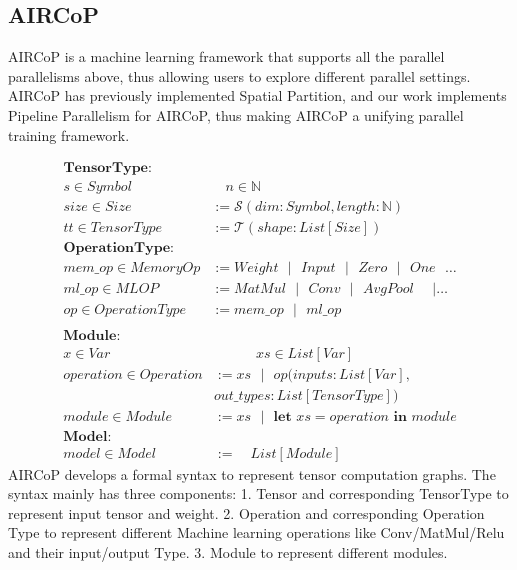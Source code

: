 \documentclass[sigplan, nonacm]{acmart}\settopmatter{printfolios=true,printccs=false,printacmref=false}
\begin{document}
\subsection{AIRCoP}
AIRCoP \cite{aircopfeiwang} is a machine learning framework that supports all the parallel parallelisms above, thus allowing users to explore different parallel settings. AIRCoP has previously implemented Spatial Partition, and our work implements Pipeline Parallelism for AIRCoP, thus making AIRCoP a unifying parallel training framework.\par
\begin{align*}\label{formalsyntax}
  \textbf{TensorType}:& \\
  s \in Symbol& \quad n  \in \mathbb{N} \\
  size \in Size& :=\mathcal{S}(dim:Symbol,length:\mathbb{N})\\
  tt\in TensorType& := \mathcal{T}(shape:List[Size])\\
  \textbf{OperationType}:& \\
  mem\_op\in MemoryOp& := Weight \text{ } | \text{ } Input \text{ } | \text{ } Zero \text{ } | \text{ } One \text{ } \dots \\
  ml\_op \in MLOP& := MatMul \text{ } | \text{ } Conv \text{ } | \text{ } AvgPool \text{ }\text{ } | \dots \\
  op \in OperationType&:= mem\_op \text{ } | \text{ } ml\_op \\
\end{align*}
\begin{align*}
  \textbf{Module}:& \\
  x \in Var& \quad \quad \quad xs \in List[Var]\\
  operation \in Operation&:= xs \text{ } | \text{ } op(inputs: List[Var], \\
  & out\_types:List[TensorType]) \\
  module \in Module&:=xs \text{ } | \text{ } \textbf{let } xs=operation \textbf{ in } module \\
  \textbf{Model}:&\\
  model \in Model&:= \quad List[Module]
\end{align*}
AIRCoP develops a formal syntax to represent tensor computation graphs. The syntax mainly has three components: 1. Tensor and corresponding TensorType to represent input tensor and weight. 2. Operation and corresponding Operation Type to represent different Machine learning operations like Conv/MatMul/Relu and their input/output Type. 3. Module to represent different modules.\par
\end{document}
